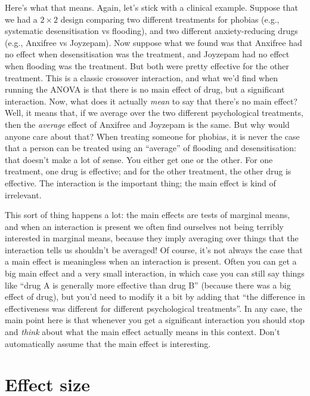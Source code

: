 \documentclass[
]{book}
\theoremstyle{definition}
\theoremstyle{definition}
\theoremstyle{definition}
\theoremstyle{definition}
\theoremstyle{remark}
\begin{document}
Here's what that means. Again, let's stick with a clinical example. Suppose that we had a \(2 \times 2\) design comparing two different treatments for phobias (e.g., systematic desensitisation vs flooding), and two different anxiety-reducing drugs (e.g., Anxifree vs Joyzepam). Now suppose what we found was that Anxifree had no effect when desensitisation was the treatment, and Joyzepam had no effect when flooding was the treatment. But both were pretty effective for the other treatment. This is a classic crossover interaction, and what we'd find when running the ANOVA is that there is no main effect of drug, but a significant interaction. Now, what does it actually \emph{mean} to say that there's no main effect? Well, it means that, if we average over the two different psychological treatments, then the \emph{average} effect of Anxifree and Joyzepam is the same. But why would anyone care about that? When treating someone for phobias, it is never the case that a person can be treated using an ``average'' of flooding and desensitisation: that doesn't make a lot of sense. You either get one or the other. For one treatment, one drug is effective; and for the other treatment, the other drug is effective. The interaction is the important thing; the main effect is kind of irrelevant.

This sort of thing happens a lot: the main effects are tests of marginal means, and when an interaction is present we often find ourselves not being terribly interested in marginal means, because they imply averaging over things that the interaction tells us shouldn't be averaged! Of course, it's not always the case that a main effect is meaningless when an interaction is present. Often you can get a big main effect and a very small interaction, in which case you can still say things like ``drug A is generally more effective than drug B'' (because there was a big effect of drug), but you'd need to modify it a bit by adding that ``the difference in effectiveness was different for different psychological treatments''. In any case, the main point here is that whenever you get a significant interaction you should stop and \emph{think} about what the main effect actually means in this context. Don't automatically assume that the main effect is interesting.

\hypertarget{effectsizefactorialanova}{%
\section{Effect size}\label{effectsizefactorialanova}}
\end{document}
